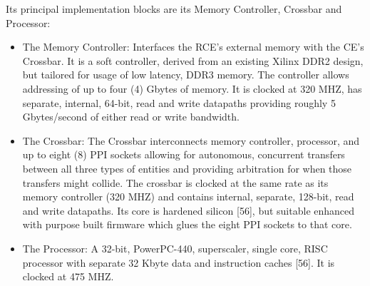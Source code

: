Its principal implementation blocks are its Memory Controller, Crossbar and Processor:
\begin{itemize}
\item The Memory Controller: Interfaces the RCE's external memory with the CE's Crossbar. It is a soft controller, derived from an existing Xilinx DDR2 design, but tailored for usage of low latency, DDR3 memory. The controller allows addressing of up to four (4) Gbytes of memory. It is clocked at 320 MHZ, has separate, internal, 64-bit, read and write datapaths providing roughly 5 Gbytes/second of either read or write bandwidth.
\item The Crossbar: The Crossbar interconnects memory controller, processor, and up to eight (8) PPI sockets allowing for autonomous, concurrent transfers between all three types of entities and providing arbitration for when those transfers might collide. The crossbar is clocked at the same rate as its memory controller (320 MHZ) and contains internal, separate, 128-bit, read and write datapaths. Its core is hardened silicon [56], but suitable enhanced with purpose built firmware which glues the eight PPI sockets to that core.
\item The Processor: A 32-bit, PowerPC-440, superscaler, single core, RISC processor with separate 32 Kbyte data and instruction caches [56]. It is clocked at 475 MHZ. 
\end{itemize}


